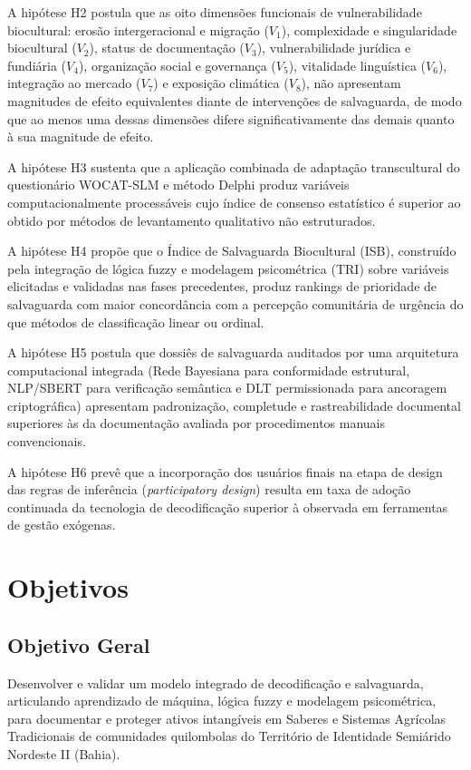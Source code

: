 A hipótese H2 postula que as oito dimensões funcionais de vulnerabilidade biocultural: erosão intergeracional e migração ($V_{1}$), complexidade e singularidade biocultural ($V_{2}$), status de documentação ($V_{3}$), vulnerabilidade jurídica e fundiária ($V_{4}$), organização social e governança ($V_{5}$), vitalidade linguística ($V_{6}$), integração ao mercado ($V_{7}$) e exposição climática ($V_{8}$), não apresentam magnitudes de efeito equivalentes diante de intervenções de salvaguarda, de modo que ao menos uma dessas dimensões difere significativamente das demais quanto à sua magnitude de efeito.

A hipótese H3 sustenta que a aplicação combinada de adaptação transcultural do questionário WOCAT-SLM e método Delphi produz variáveis computacionalmente processáveis cujo índice de consenso estatístico é superior ao obtido por métodos de levantamento qualitativo não estruturados.

A hipótese H4 propõe que o Índice de Salvaguarda Biocultural (ISB), construído pela integração de lógica fuzzy e modelagem psicométrica (TRI) sobre variáveis elicitadas e validadas nas fases precedentes, produz rankings de prioridade de salvaguarda com maior concordância com a percepção comunitária de urgência do que métodos de classificação linear ou ordinal.

A hipótese H5 postula que dossiês de salvaguarda auditados por uma arquitetura computacional integrada (Rede Bayesiana para conformidade estrutural, NLP/SBERT para verificação semântica e DLT permissionada para ancoragem criptográfica) apresentam padronização, completude e rastreabilidade documental superiores às da documentação avaliada por procedimentos manuais convencionais.

A hipótese H6 prevê que a incorporação dos usuários finais na etapa de design das regras de inferência (\textit{participatory design}) resulta em taxa de adoção continuada da tecnologia de decodificação superior à observada em ferramentas de gestão exógenas.



\section{Objetivos}
\subsection{Objetivo Geral}

Desenvolver e validar um modelo integrado de decodificação e salvaguarda, articulando aprendizado de máquina, lógica fuzzy e modelagem psicométrica, para documentar e proteger ativos intangíveis em Saberes e Sistemas Agrícolas Tradicionais de comunidades quilombolas do Território de Identidade Semiárido Nordeste II (Bahia).

